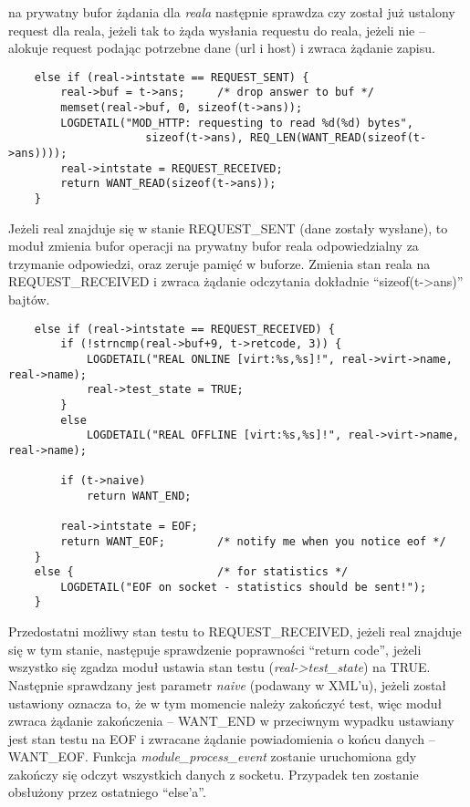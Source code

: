 \documentclass[polish,12pt]{article}
\begin{document}
na prywatny bufor żądania dla \textit{reala} następnie sprawdza czy został już ustalony request dla reala,
jeżeli tak to żąda wysłania requestu do reala, jeżeli nie -- alokuje request podając potrzebne dane (url i host)
i zwraca żądanie zapisu.
\newline
{\small
\begin{verbatim}
    else if (real->intstate == REQUEST_SENT) {
        real->buf = t->ans;     /* drop answer to buf */
        memset(real->buf, 0, sizeof(t->ans));
        LOGDETAIL("MOD_HTTP: requesting to read %d(%d) bytes",
                     sizeof(t->ans), REQ_LEN(WANT_READ(sizeof(t->ans))));
        real->intstate = REQUEST_RECEIVED;
        return WANT_READ(sizeof(t->ans));
    }
\end{verbatim}
}
Jeżeli real znajduje się w stanie REQUEST\_SENT (dane zostały wysłane), to moduł zmienia bufor operacji
na prywatny bufor reala odpowiedzialny za trzymanie odpowiedzi, oraz zeruje pamięć w buforze.
Zmienia stan reala na REQUEST\_RECEIVED i zwraca żądanie odczytania dokładnie ``sizeof(t->ans)'' bajtów.
\newpage
{\small
\begin{verbatim}
    else if (real->intstate == REQUEST_RECEIVED) {
        if (!strncmp(real->buf+9, t->retcode, 3)) {
            LOGDETAIL("REAL ONLINE [virt:%s,%s]!", real->virt->name, real->name);
            real->test_state = TRUE;
        }
        else
            LOGDETAIL("REAL OFFLINE [virt:%s,%s]!", real->virt->name, real->name);

        if (t->naive)
            return WANT_END;

        real->intstate = EOF;
        return WANT_EOF;        /* notify me when you notice eof */
    }
    else {                      /* for statistics */
        LOGDETAIL("EOF on socket - statistics should be sent!");
    }
\end{verbatim}
}
Przedostatni możliwy stan testu to REQUEST\_RECEIVED, jeżeli real znajduje się w tym stanie,
następuje sprawdzenie poprawności ``return code'', jeżeli wszystko się zgadza moduł ustawia
stan testu (\textit{real->test\_state}) na TRUE. \newline
Następnie sprawdzany jest parametr \textit{naive} (podawany w XML'u), jeżeli został ustawiony
oznacza to, że w tym momencie należy zakończyć test, więc moduł zwraca żądanie zakończenia -- WANT\_END
w przeciwnym wypadku ustawiany jest stan testu na EOF i zwracane żądanie powiadomienia o końcu danych -- WANT\_EOF.
Funkcja \textit{module\_process\_event} zostanie uruchomiona gdy zakończy się odczyt wszystkich danych z socketu.
Przypadek ten zostanie obsłużony przez ostatniego ``else'a''.
\end{document}

